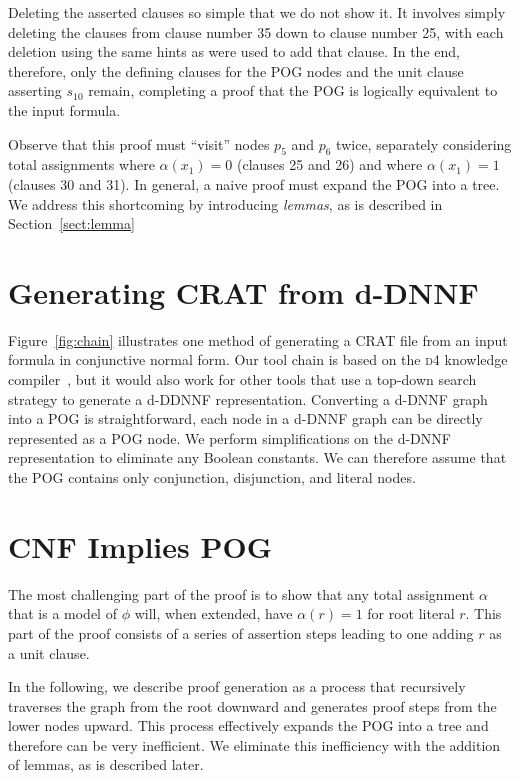 \documentclass[letterpaper,USenglish,cleveref, autoref, thm-restate]{lipics-v2021}
\newcommand{\assign}{\alpha}
\newcommand{\progname}[1]{\textsc{#1}}
\newcommand{\dfour}{\progname{d4}}
\begin{document}
Deleting the asserted clauses so simple that we do not show it.  It
involves simply deleting the clauses from clause number 35 down to
clause number 25, with each deletion using the same hints as were used
to add that clause.  In the end, therefore, only the defining clauses
for the POG nodes and the unit clause asserting $s_{10}$ remain,
completing a proof that the POG is logically equivalent to the input
formula.

Observe that this proof must ``visit'' nodes
$p_5$ and $p_6$ twice, separately considering total assignments where $\assign(x_1) = 0$
(clauses 25 and 26) and where $\assign(x_1) = 1$ (clauses 30 and 31).  In
general, a naive proof must expand the POG into a tree.
We address this shortcoming by introducing {\em lemmas}, as is described in Section~\ref{sect:lemma}



\section{Generating CRAT from d-DNNF}

Figure~\ref{fig:chain} illustrates one method of generating a CRAT
file from an input formula in conjunctive normal form.  Our tool chain
is based on the \dfour{} knowledge compiler~\cite{lagniez:ijcai:2017},
but it would also work for other tools that use a top-down search
strategy to generate a d-DDNNF representation.  Converting a d-DNNF
graph into a POG is straightforward, each node in a d-DNNF graph can
be directly represented as a POG node.  We perform simplifications on
the d-DNNF representation to eliminate any Boolean constants.  We can
therefore assume that the POG contains only conjunction, disjunction,
and literal nodes.

\section{CNF Implies POG}

The most challenging part of the proof is to show that any total
assignment $\alpha$ that is a model of $\phi$ will, when extended,
have $\assign(r) = 1$ for root literal
$r$.  This part of the proof consists of a series of assertion steps
leading to one adding $r$ as a unit clause.

In the following, we describe proof generation as a process that
recursively traverses the graph from the root downward and
generates proof steps from the lower nodes upward.  This process
effectively expands the POG into a tree and therefore can be very
inefficient.  We eliminate this inefficiency with the addition of
lemmas, as is described later.
\end{document}

